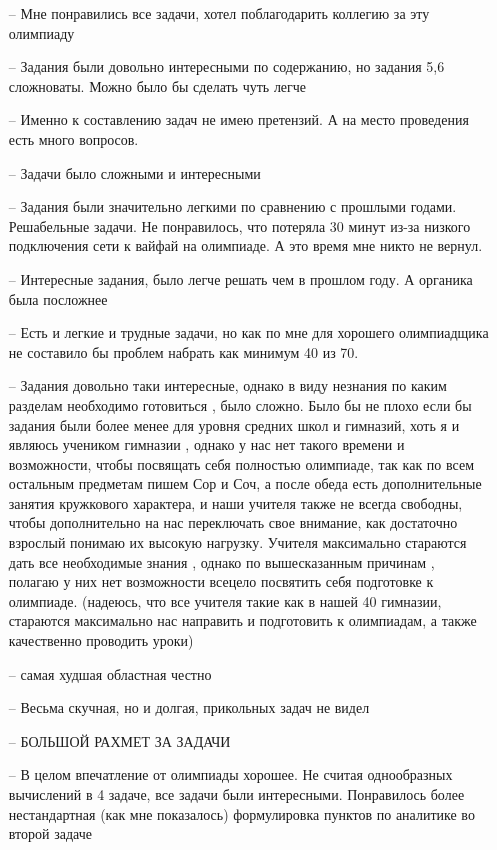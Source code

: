 \begin{itemize}
    \item[--] Мне понравились все задачи, хотел поблагодарить коллегию за эту олимпиаду
    \item[--] Задания были довольно интересными по содержанию, но задания 5,6 сложноваты. Можно было бы сделать чуть легче
    \item[--] Именно к составлению задач не имею претензий. А на место проведения есть много вопросов.
    \item[--] Задачи было сложными и интересными
    \item[--] Задания были значительно легкими по сравнению с прошлыми годами. Решабельные задачи. Не понравилось, что потеряла 30 минут из-за низкого подключения сети к вайфай на олимпиаде. А это время мне никто не вернул.
    \item[--] Интересные задания, было легче решать чем в прошлом году. А органика была посложнее
    \item[--] Есть и легкие и трудные задачи, но как по мне для хорошего олимпиадщика не составило бы проблем набрать как минимум 40 из 70.
    \item[--] Задания довольно таки интересные, однако в виду незнания по каким разделам необходимо готовиться , было сложно. Было бы не плохо если бы задания были более менее для уровня средних школ и гимназий, хоть я и являюсь учеником гимназии , однако у нас нет такого времени и возможности, чтобы посвящать себя полностью олимпиаде, так как по всем остальным предметам пишем Сор и Соч, а после обеда есть дополнительные занятия кружкового характера, и наши учителя также не всегда свободны, чтобы дополнительно на нас переключать свое внимание, как достаточно взрослый понимаю их высокую нагрузку. Учителя максимально стараются дать все необходимые знания , однако по вышесказанным причинам , полагаю у них нет возможности всецело посвятить себя подготовке к олимпиаде. (надеюсь, что все учителя такие как в нашей 40 гимназии, стараются максимально нас направить и подготовить к олимпиадам, а также качественно проводить уроки)
    \item[--] самая худшая областная честно
    \item[--] Весьма скучная, но и долгая, прикольных задач не видел
    \item[--] БОЛЬШОЙ РАХМЕТ ЗА ЗАДАЧИ
    \item[--] В целом впечатление от олимпиады хорошее. Не считая однообразных вычислений в 4 задаче, все задачи были интересными. Понравилось более нестандартная (как мне показалось) формулировка пунктов по аналитике во второй задаче

\end{itemize}
